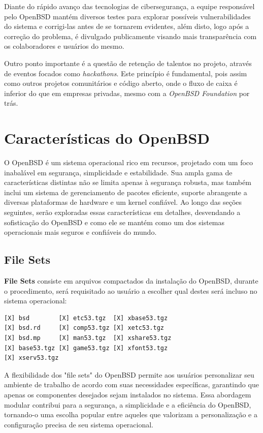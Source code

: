 \documentclass[a4paper,10pt]{article}
\begin{document}
Diante do rápido avanço das tecnologias de cibersegurança, a equipe responsável pelo OpenBSD mantém diversos testes para explorar possíveis vulnerabilidades do sistema e corrigi-las antes de se tornarem evidentes, além disto, logo após a correção do problema, é divulgado publicamente visando mais transparência com os colaboradores e usuários do mesmo.

Outro ponto importante é a questão de retenção de talentos no projeto, através de eventos focados como \textit{hackathons}. Este princípio é fundamental, pois assim como outros projetos comunitários e código aberto, onde o fluxo de caixa é inferior do que em empresas privadas, mesmo com a \textit{OpenBSD Foundation} por trás.

\section{Características do OpenBSD}

O OpenBSD é um sistema operacional rico em recursos, projetado com um foco inabalável em segurança, simplicidade e estabilidade. Sua ampla gama de características distintas não se limita apenas à segurança robusta, mas também inclui um sistema de gerenciamento de pacotes eficiente, suporte abrangente a diversas plataformas de hardware e um kernel  confiável. Ao longo das seções seguintes, serão exploradas essas características em detalhes, desvendando a sofisticação do OpenBSD e como ele se mantém como um dos sistemas operacionais mais seguros e confiáveis do mundo.

\subsection{File Sets}

\textbf{File Sets} consiste em arquivos compactados da instalação do OpenBSD, durante o procedimento, será requisitado ao usuário a escolher qual destes será incluso no sistema operacional:

\begin{lstlisting}[caption=\textbf{File Sets} disponíveis durante a instalação]
[X] bsd        [X] etc53.tgz  [X] xbase53.tgz
[X] bsd.rd     [X] comp53.tgz [X] xetc53.tgz
[X] bsd.mp     [X] man53.tgz  [X] xshare53.tgz
[X] base53.tgz [X] game53.tgz [X] xfont53.tgz
[X] xserv53.tgz
\end{lstlisting}

A flexibilidade dos "file sets" do OpenBSD permite aos usuários personalizar seu ambiente de trabalho de acordo com suas necessidades específicas, garantindo que apenas os componentes desejados sejam instalados no sistema. Essa abordagem modular contribui para a segurança, a simplicidade e a eficiência do OpenBSD, tornando-o uma escolha popular entre aqueles que valorizam a personalização e a configuração precisa de seu sistema operacional.
\end{document}
